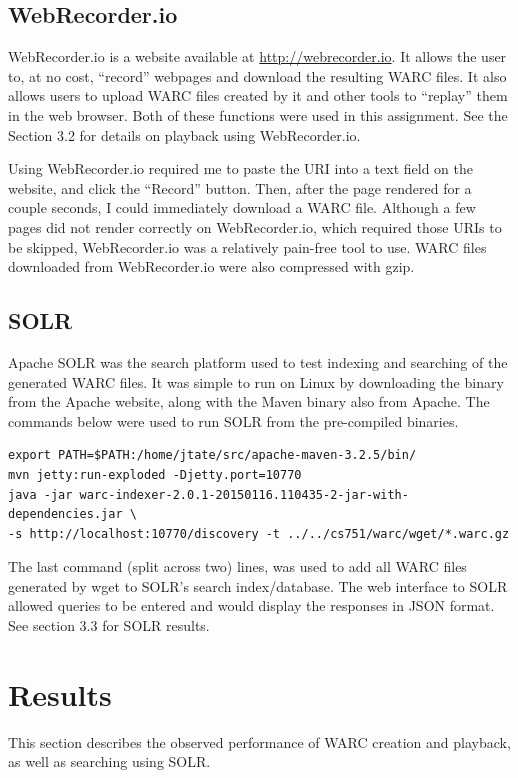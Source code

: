 \documentclass[a4paper,12pt]{article}
\begin{document}
\subsection{WebRecorder.io}
WebRecorder.io is a website available at \url{http://webrecorder.io}. It allows the user to, at no cost,
``record'' webpages and download the resulting WARC files. It also allows users to upload WARC files created
by it and other tools to ``replay'' them in the web browser. Both of these functions were used in this
assignment. See the Section 3.2 for details on playback using WebRecorder.io.

Using WebRecorder.io required me to paste the URI into a text field on the website, and click the ``Record''
button. Then, after the page rendered for a couple seconds, I could immediately download a WARC file.
Although a few pages did not render correctly on WebRecorder.io, which required those URIs to be skipped,
WebRecorder.io was a relatively pain-free tool to use. WARC files downloaded from WebRecorder.io were also
compressed with gzip.

\subsection{SOLR}
Apache SOLR was the search platform used to test indexing and searching of the generated WARC files. It was
simple to run on Linux by downloading the binary from the Apache website, along with the Maven binary also
from Apache. The commands below were used to run SOLR from the pre-compiled binaries.
\begin{lstlisting}[basicstyle=\ttfamily]
export PATH=$PATH:/home/jtate/src/apache-maven-3.2.5/bin/
mvn jetty:run-exploded -Djetty.port=10770
java -jar warc-indexer-2.0.1-20150116.110435-2-jar-with-dependencies.jar \
-s http://localhost:10770/discovery -t ../../cs751/warc/wget/*.warc.gz
\end{lstlisting}
The last command (split across two) lines, was used to add all WARC files generated by wget to SOLR's
search index/database. The web interface to SOLR allowed queries to be entered and would display the
responses in JSON format. See section 3.3 for SOLR results.

\section{Results}
This section describes the observed performance of WARC creation and playback, as well as searching using
SOLR.
\end{document}
